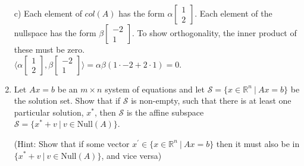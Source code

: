 \documentclass[12pt]{article}
\newif\ifsln
\newcommand{\R}{\mathbb{R}}
\newcommand{\halmos}{\hfill$\blacksquare$}
\begin{document}
\begin{enumerate}[1.]
c) Each element of $col(A)$ has the form $\alpha\begin{bmatrix}1 \\ 2\end{bmatrix}$. Each element of the nullspace has the form $\beta \begin{bmatrix}-2 \\ 1 \end{bmatrix}$. To show orthogonality, the inner product of these must be zero.\\

$\langle \alpha\begin{bmatrix}1 \\ 2\end{bmatrix}, \beta \begin{bmatrix}-2 \\ 1 \end{bmatrix} \rangle = \alpha \beta (1\cdot -2 + 2 \cdot 1) = 0$.

\fi

\item Let $Ax=b$ be an $m\times n$ system of equations and let $\mathcal{S} = \{x \in \R^{n} \ | \ Ax = b\}$ be the solution set. Show that if $\mathcal{S}$ is non-empty, such that there is at least one particular solution, $x^{*}$, then $\mathcal{S}$ is the affine subspace $\mathcal{S} = \{x^{*} + v \ | \ v \in \text{Null}(A)\}$.\smallskip

(Hint: Show that if some vector $x^{\prime} \in \{x \in \R^{n} \ | \ Ax = b\}$ then it must also be in $\{x^{*} + v \ | \ v \in \text{Null}(A)\}$, and vice versa)\\

\ifsln
\textit{Solution:}\\
Let $x^{\prime} \in \{x \in \R^{n} \ | \ Ax = b\}$. Consider the vector $v = x^{\prime} - x^{*}$. $Av = A(x^{\prime} - x^{*}) = Ax^{\prime} - Ax^{*} = b - b = 0$. Therefore $v \in \text{Null}(A)$. So $x^{\prime}= x^{*} + v$, $v \in \text{Null}(A)$, and $x^{\prime} \in \{x^{*} + v \ | \ v \in \text{Null}(A)\}$.\\

Let $x^{\prime} \in \{x^{*} + v \ | \ v \in \text{Null}(A)\}$. Then $x^{\prime} = x^{*} + v$, for some $v \in \text{Null}(A)$. $Ax^{\prime} = A(x^{*} + v) = Ax^{*} + Av = b + 0 = b$. Therefore $x^{\prime} \in \{x \in \R^{n} \ | \ Ax = b\}$. \halmos
\fi



\end{enumerate}
\end{document}
